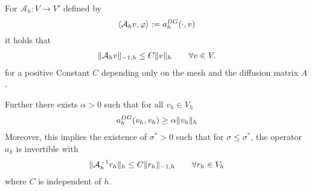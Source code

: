 \begin{theorem}[Stability]\label{thm: SIPG stability}
	For $\mathcal A_h:V \rightarrow V'$ defined by 
	\[
	 \langle \mathcal A_h v, \varphi \rangle := a_h^{DG}(\cdot, v)
	\]
	it holds that  
	\begin{align*}
	\HMinusOneDnorm{\mathcal A_h v} \leq C \eNorm v \qquad \forall v \in V. %
	\end{align*}
	for a positive Constant $C$ depending only on the mesh and the diffusion matrix $A$. 
	
	Further there exists $\alpha > 0 $ such that for all $v_h \in V_h$
	\begin{align}
		a_h^{DG}(v_h, v_h) \geq \alpha \lVert v_h \rVert_{h} \label{eq: coercivity DG form}
	\end{align}	
	Moreover, this implies the existence of $\sigma^* > 0$ such that for $\sigma \leq \sigma^* $, the operator $a_h$ is invertible with 
	\begin{align*}
	\eNorm {\mathcal A_h^{-1} {r_h}} \leq C \HMinusOneDnorm {r_h} \qquad \forall r_h \in V_h %
	\end{align*}
	where $C$ is independent of $h$. 
\end{theorem}
